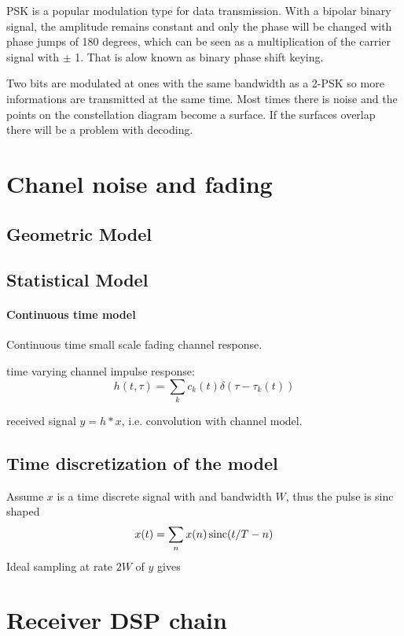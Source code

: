 PSK is a popular modulation type for data transmission\cite{Meyer2011}. With a bipolar binary signal, the amplitude remains constant and only the phase will be changed with phase jumps of 180 degrees, which can be seen as a multiplication of the carrier signal with $\pm$ 1. That is alow known as binary phase shift keying.


Two bits are modulated at ones with the same bandwidth as a 2-PSK so more informations are transmitted at the same time. \cite{Meyer2011}
Most times there is noise and the points on the constellation diagram become a surface. 
If the surfaces overlap there will be a problem with decoding. 

\section{Chanel noise and fading}

\subsection{Geometric Model}


\subsection{Statistical Model}


\paragraph{Continuous time model}

Continuous time small scale fading channel response.

time varying channel impulse response:
\begin{equation}
	h(t, \tau) = \sum_k c_k (t) \delta(\tau - \tau_k(t))
\end{equation}

received signal \(y = h * x\), i.e. convolution with channel model. 

\subsection{Time discretization of the model}


Assume \(x\) is a time discrete signal with and bandwidth \(W\), thus the pulse is sinc shaped
\begin{equation}
	x(t) = \sum_n x(n) \operatorname{sinc}(t/T - n)
\end{equation}
Ideal sampling at rate \(2W\) of \(y\) gives

\section{Receiver DSP chain}
